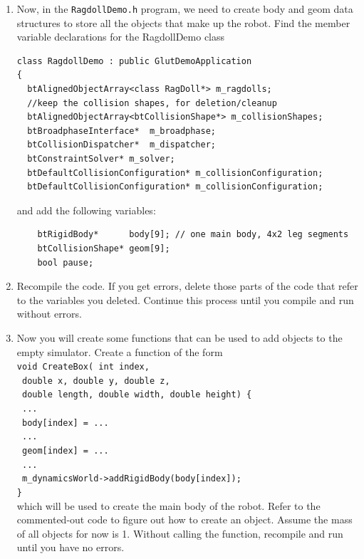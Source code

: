 \documentclass[12pt]{article}
\begin{document}
\begin{enumerate}
\item Now, in the \texttt{RagdollDemo.h} program, we need to create
  body and geom data structures to store all the objects that make up
  the robot. Find the member variable declarations for the RagdollDemo class

\begin{verbatim}
class RagdollDemo : public GlutDemoApplication
{
  btAlignedObjectArray<class RagDoll*> m_ragdolls;
  //keep the collision shapes, for deletion/cleanup
  btAlignedObjectArray<btCollisionShape*> m_collisionShapes;
  btBroadphaseInterface*  m_broadphase;
  btCollisionDispatcher*  m_dispatcher;
  btConstraintSolver* m_solver;
  btDefaultCollisionConfiguration* m_collisionConfiguration;
  btDefaultCollisionConfiguration* m_collisionConfiguration;
\end{verbatim}

and add the following variables:

\begin{verbatim}
    btRigidBody*      body[9]; // one main body, 4x2 leg segments
    btCollisionShape* geom[9];
    bool pause;
\end{verbatim}

\item Recompile the code. If you get errors, delete those parts of the code that refer to the variables you deleted. Continue this process until you compile and run without errors.

\item Now you will create some functions that can be used to add objects to the empty simulator. Create a function of the form \\
\texttt{void CreateBox( int index,}\\
\texttt{        double x, double y, double z,}\\
\texttt{        double length, double width, double height) \{}\\
\texttt{  ...}\\
\texttt{  body[index] = ...}\\
\texttt{  ...}\\
\texttt{  geom[index] = ...}\\
\texttt{  ...}\\
\texttt{  m\_dynamicsWorld->addRigidBody(body[index]);}\\
\texttt{\}} \\
which will be used to create the main body of the robot. Refer to the commented-out code to figure out how to create an object. Assume the mass of all objects for now is 1. Without calling the function, recompile and run until you have no errors.


\end{enumerate}
\end{document}

